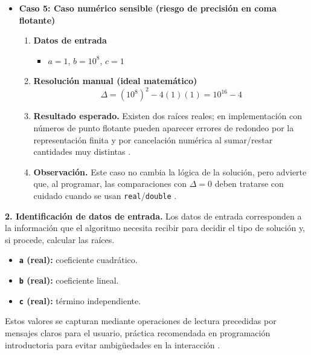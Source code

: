 \documentclass[12pt,twoside]{book}
\begin{document}
\begin{itemize}
							\item \textbf{Caso 5: Caso numérico sensible (riesgo de precisión en coma flotante)}
							
							\begin{enumerate}
								\item \textbf{Datos de entrada}
								\begin{itemize}
									\item $a=1$, $b=10^8$, $c=1$
								\end{itemize}
								\item \textbf{Resolución manual (ideal matemático)}
								\[
								\Delta=(10^8)^2-4(1)(1)=10^{16}-4
								\]
								\item \textbf{Resultado esperado.} Existen dos raíces reales; en implementación con números de punto flotante pueden aparecer errores de redondeo por la representación finita y por cancelación numérica al sumar/restar cantidades muy distintas \cite{Goldberg1991What,IEEE2019Standard754}.
								\item \textbf{Observación.} Este caso no cambia la lógica de la solución, pero advierte que, al programar, las comparaciones con $\Delta=0$ deben tratarse con cuidado cuando se usan \texttt{real}/\texttt{double} \cite{Goldberg1991What}.
							\end{enumerate}
						\end{itemize}

						\noindent
						\textbf{2. Identificación de datos de entrada.}
						Los datos de entrada corresponden a la información que el algoritmo necesita recibir para decidir el tipo de solución y, si procede, calcular las raíces.
						
						\begin{itemize}
							\item \textbf{\texttt{a} (real):} coeficiente cuadrático.
							\item \textbf{\texttt{b} (real):} coeficiente lineal.
							\item \textbf{\texttt{c} (real):} término independiente.
						\end{itemize}
						
						\noindent
						Estos valores se capturan mediante operaciones de lectura precedidas por mensajes claros para el usuario, práctica recomendada en programación introductoria para evitar ambigüedades en la interacción \cite{Gaddis2022Starting,Farrell2018Programming}.
						
\end{document}
